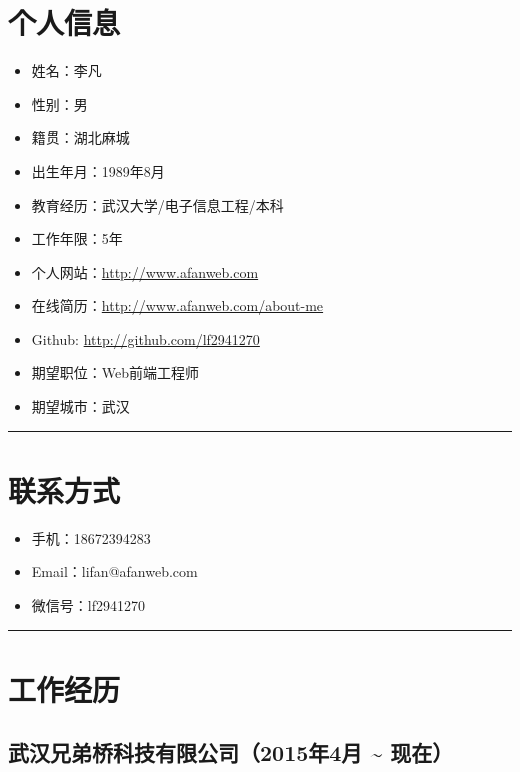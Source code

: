 \section{个人信息}\label{ux4e2aux4ebaux4fe1ux606f}

\begin{itemize}
\item
  姓名：李凡
\item
  性别：男
\item
  籍贯：湖北麻城
\item
  出生年月：1989年8月
\item
  教育经历：武汉大学/电子信息工程/本科
\item
  工作年限：5年
\item
  个人网站：\url{http://www.afanweb.com}
\item
  在线简历：\url{http://www.afanweb.com/about-me}
\item
  Github: \url{http://github.com/lf2941270}
\item
  期望职位：Web前端工程师
\item
  期望城市：武汉
\end{itemize}

\begin{center}\rule{0.5\linewidth}{\linethickness}\end{center}

\section{联系方式}\label{ux8054ux7cfbux65b9ux5f0f}

\begin{itemize}
\tightlist
\item
  手机：18672394283
\item
  Email：lifan@afanweb.com
\item
  微信号：lf2941270
\end{itemize}

\begin{center}\rule{0.5\linewidth}{\linethickness}\end{center}

\section{工作经历}\label{ux5de5ux4f5cux7ecfux5386}

\subsection{武汉兄弟桥科技有限公司（2015年4月 \textasciitilde{}
现在）}\label{ux6b66ux6c49ux5144ux5f1fux6865ux79d1ux6280ux6709ux9650ux516cux53f82015ux5e744ux6708-ux73b0ux5728}

